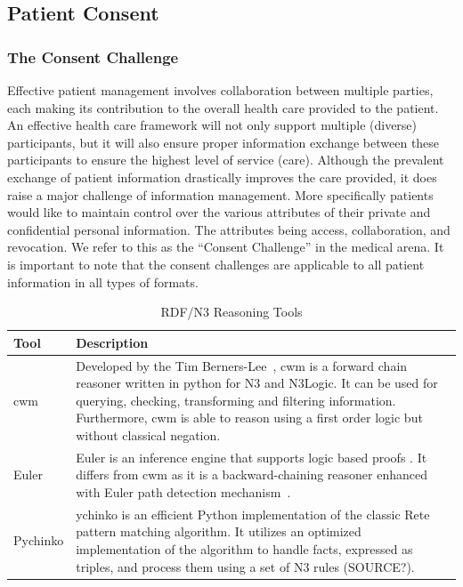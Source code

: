 \documentclass[conference]{IEEEtran}
\begin{document}
\subsection{Patient Consent}
\label{pat-consent}

\subsubsection*{The Consent Challenge}
Effective patient management involves collaboration between multiple parties, each making its contribution to the overall health care provided to the patient. 
An effective health care framework will not only support multiple (diverse) participants, but it will also ensure proper information exchange between these
participants to ensure the highest level of service (care).  Although the prevalent exchange of patient information drastically improves the care provided, it
does raise a major challenge of information management.  More specifically patients would like to maintain control over the various attributes of their private
and confidential personal information.  The attributes being access, collaboration, and revocation.  We refer to this as the “Consent Challenge” in the medical
arena.  It is important to note that the consent challenges are applicable to all patient information in all types of formats.  

\begin{table}[!t]
\centering
 \begin{tabular}{m{1cm}|m{9cm}}
\textbf{Tool} & \textbf{Description}\\
\hline\hline
cwm & Developed by the Tim Berners-Lee~\cite{berners-lee2008}, cwm is a forward chain reasoner written in python for N3 and N3Logic.  It can be used for
querying, checking, transforming and filtering information.  Furthermore, cwm is able to reason using a first order logic but without classical negation.\\
\hline
Euler & Euler is an inference engine that supports logic based proofs .  It differs from cwm as it is a backward-chaining reasoner enhanced with Euler path
detection mechanism~\cite{naudts2003inference}.\\
\hline
Pychinko & ychinko is an efficient Python implementation of the classic Rete pattern matching algorithm.  It utilizes an optimized implementation of the
algorithm to handle facts, expressed as triples, and process them using a set of N3 rules (SOURCE?).\\
 \end{tabular}
\label{tab:n3tools}
\caption{RDF/N3 Reasoning Tools}
\end{table}
\end{document}
